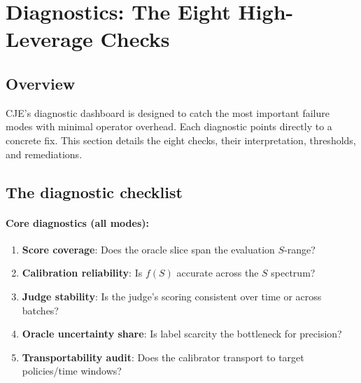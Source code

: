 \section{Diagnostics: The Eight High-Leverage Checks}

\subsection{Overview}

CJE's diagnostic dashboard is designed to catch the most important failure modes with minimal operator overhead. Each diagnostic points directly to a concrete fix. This section details the eight checks, their interpretation, thresholds, and remediations.

\subsection{The diagnostic checklist}

\paragraph{Core diagnostics (all modes):}
\begin{enumerate}
\item \textbf{Score coverage}: Does the oracle slice span the evaluation $S$-range?
\item \textbf{Calibration reliability}: Is $f(S)$ accurate across the $S$ spectrum?
\item \textbf{Judge stability}: Is the judge's scoring consistent over time or across batches?
\item \textbf{Oracle uncertainty share}: Is label scarcity the bottleneck for precision?
\item \textbf{Transportability audit}: Does the calibrator transport to target policies/time windows?
\end{enumerate}

